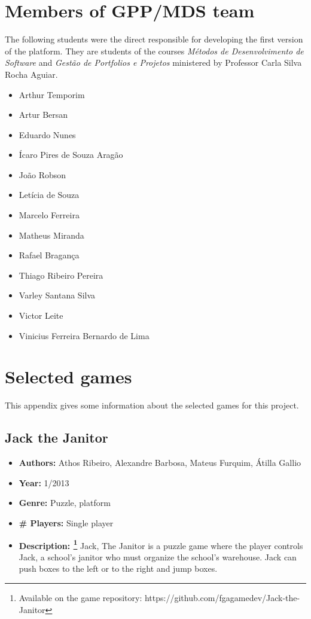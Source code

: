 \begin{apendicesenv}

\partapendices

\chapter{Members of GPP/MDS team}
\label {sec:apendice_a}

The following students were the direct responsible for developing the first version of the platform. They are students of the courses \textit{M\'etodos de Desenvolvimento de Software} and \textit{Gest\~ao de Portfolios e Projetos} ministered by Professor Carla Silva Rocha Aguiar.

\begin{itemize}
\item Arthur Temporim
\item Artur Bersan
\item Eduardo Nunes
\item Ícaro Pires de Souza Aragão
\item João Robson
\item Letícia de Souza
\item Marcelo Ferreira
\item Matheus Miranda
\item Rafael Bragança
\item Thiago Ribeiro Pereira
\item Varley Santana Silva
\item Victor Leite
\item Vinicius Ferreira Bernardo de Lima
\end{itemize}

\chapter{Selected games}
\label {sec:selected_games}

This appendix gives some information about the selected games for this project.

\section{Jack the Janitor}
\label {sec:jack_the_janitor}

\begin{itemize}
\item[] \textbf{Authors:} Athos Ribeiro, Alexandre Barbosa, Mateus Furquim, Átilla Gallio
\item[] \textbf{Year:} 1/2013
\item[] \textbf{Genre:} Puzzle, platform
\item[] \textbf{\# Players:} Single player
\item[] \textbf{Description: \footnote{Available on the game repository: https://github.com/fgagamedev/Jack-the-Janitor}} Jack, The Janitor is a puzzle game where the player controls Jack, a school's janitor who must organize the school's warehouse. Jack can push boxes to the left or to the right and jump boxes.


\end{itemize}
\end{apendicesenv}
